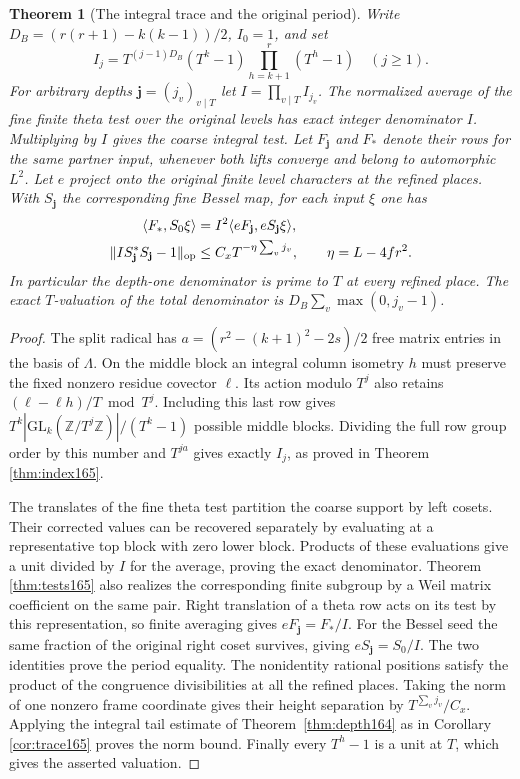 \documentclass[a4paper,11pt]{article}
\newtheorem{theorem}[proposition]{Theorem}
\theoremstyle{definition}
\theoremstyle{remark}
\newcommand{\ZZ}{\mathbb Z}\newcommand{\ord}{\operatorname{ord}}
\numberwithin{equation}{section}
\begin{document}
\begin{theorem}[The integral trace and the original period]
\label{thm:trace166}
Write \(D_B=(r(r+1)-k(k-1))/2\), \(I_0=1\), and set
\[
       I_j=T^{(j-1)D_B}(T^k-1)
                     \prod_{h=k+1}^{r}(T^h-1)\quad(j\ge1).
\]
For arbitrary depths \(\mathbf j=(j_v)_{v\mid T}\) let
\(I=\prod_{v\mid T} I_{j_v}\). The normalized average of the
fine finite theta test over the original levels has exact
integer denominator \(I\). Multiplying by \(I\) gives the
coarse integral test. Let \(F_{\mathbf j}\) and \(F_*\) denote
their rows for the same partner input, whenever both lifts
converge and belong to automorphic \(L^2\). Let \(e\) project
onto the original finite level characters at the refined places.
With \(S_{\mathbf j}\) the corresponding fine Bessel map, for
each input \(\xi\) one has
\begin{align*}
  \langle F_*,S_0\xi\rangle
       &=I^2\langle eF_{\mathbf j},e S_{\mathbf j}\xi\rangle,\\
  \|I S_{\mathbf j}^*S_{\mathbf j}-1\|_{\rm op}
       &\le C_x T^{-\eta\sum_v j_v},\qquad \eta=L-4fr^2 .
\end{align*}
In particular the depth-one denominator is prime to \(T\) at
every refined place. The exact \(T\)-valuation of the total
denominator is \(D_B\sum_v\max(0,j_v-1)\).
\end{theorem}
\begin{proof}
The split radical has \(a=(r^2-(k+1)^2-2s)/2\) free matrix
entries in the basis of \(\Lambda\). On the middle block an
integral column isometry \(h\) must preserve the fixed nonzero
residue covector \(\ell\). Its action modulo \(T^j\) also
retains \((\ell-\ell h)/T\bmod T^j\). Including this last
row gives \(T^k|\mathrm{GL}_k(\ZZ/T^j\ZZ)|/(T^k-1)\) possible middle
blocks. Dividing the full row group order by this number and
\(T^{ja}\) gives exactly \(I_j\), as proved in
Theorem \ref{thm:index165}.

The translates of the fine theta test partition the coarse
support by left cosets. Their corrected values can be recovered
separately by evaluating at a representative top block with
zero lower block. Products of these evaluations give a unit
divided by \(I\) for the average, proving the exact denominator.
Theorem \ref{thm:tests165} also realizes the corresponding finite
subgroup by a Weil matrix coefficient on the same pair.
Right translation of a theta row acts on its test by this
representation, so finite averaging gives \(eF_{\mathbf j}
=F_*/I\). For the Bessel seed the same fraction of the original
right coset survives, giving \(e S_{\mathbf j}=S_0/I\).
The two identities prove the period equality. The nonidentity
rational positions satisfy the product of the congruence
divisibilities at all the refined places. Taking the norm of
one nonzero frame coordinate gives their height separation
by \(T^{\sum_v j_v}/C_x\). Applying the integral tail estimate
of Theorem~\ref{thm:depth164} as in Corollary \ref{cor:trace165}
proves the norm bound. Finally every \(T^h-1\) is a unit at
\(T\), which gives the asserted valuation.
\end{proof}
\end{document}
